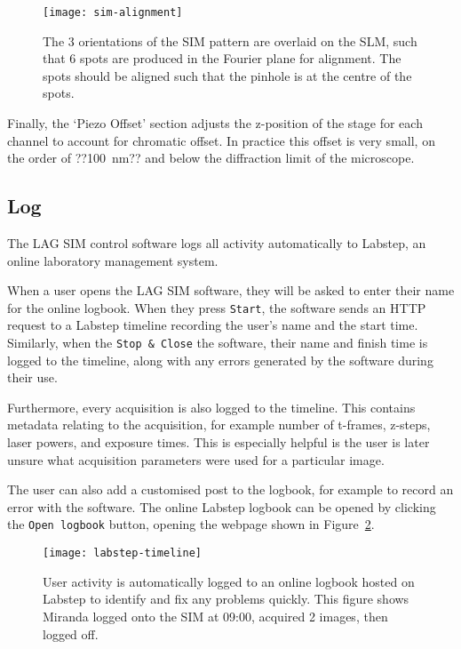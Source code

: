 \begin{figure}[htbp!]
\centering
\texttt{[image: sim-alignment]}
\caption[LAG SIM: Displaying specially designed patterns on the SLM assists with alignment of LAG SIM]{The 3 orientations of the SIM pattern are overlaid on the SLM, such that 6 spots are produced in the Fourier plane for alignment. The spots should be aligned such that the pinhole is at the centre of the spots.}
\label{fig:pinhole-alignment}
\end{figure}

Finally, the `Piezo Offset' section adjusts the z-position of the stage for each channel to account for chromatic offset. 
In practice this offset is very small, on the order of ??\SI{100}{\nano\meter}?? and below the diffraction limit of the microscope. 

\subsection{Log}
The LAG SIM control software logs all activity automatically to Labstep, an online laboratory management system. 

When a user opens the LAG SIM software, they will be asked to enter their name for the online logbook. 
When they press \texttt{Start}, the software sends an HTTP request to a Labstep timeline recording the user's name and the start time. 
Similarly, when the \texttt{Stop \& Close} the software, their name and finish time is logged to the timeline, along with any errors generated by the software during their use. 

Furthermore, every acquisition is also logged to the timeline. 
This contains metadata relating to the acquisition, for example number of t-frames, z-steps, laser powers, and exposure times. 
This is especially helpful is the user is later unsure what acquisition parameters were used for a particular image. 

The user can also add a customised post to the logbook, for example to record an error with the software. 
The online Labstep logbook can be opened by clicking the \texttt{Open logbook} button, opening the webpage shown in Figure~\ref{fig:labstepTimeline}. 

\begin{figure}[htbp!]
\centering
\texttt{[image: labstep-timeline]}
\caption[LAG SIM: Logging user activity with Labstep allows any problems to be identified and fixed quickly]{User activity is automatically logged to an online logbook hosted on Labstep to identify and fix any problems quickly. This figure shows Miranda logged onto the SIM at 09:00, acquired 2 images, then logged off.} %
\label{fig:labstepTimeline}
\end{figure}

